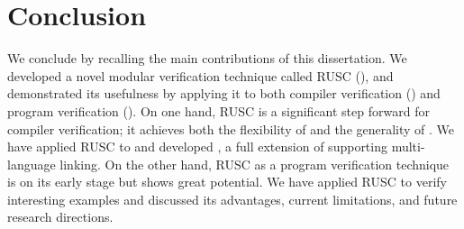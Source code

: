 \chapter{\;\;\;\;Conclusion}
\label{sec:conclusion}

We conclude by recalling the main contributions of this dissertation.
We developed a novel modular verification technique called RUSC (), and demonstrated
its usefulness by applying it to both compiler verification () and program verification ().
On one hand, RUSC is a significant step forward for compiler verification; it achieves both the flexibility of \ccx{} and the generality of \ccc{}.
We have applied RUSC to \cc{} and developed \ccm{}, a full extension of \cc{} supporting multi-language linking.
On the other hand, RUSC as a program verification technique is on its early stage but shows great potential.
We have applied RUSC to verify interesting examples and discussed its advantages, current limitations, and future research directions.







